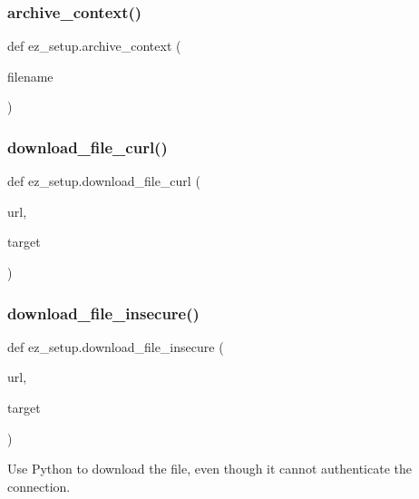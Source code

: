 \subsubsection{\texorpdfstring{archive\+\_\+context()}{archive\_context()}}
{\footnotesize\ttfamily def ez\+\_\+setup.\+archive\+\_\+context (\begin{DoxyParamCaption}\item[{}]{filename }\end{DoxyParamCaption})}

\mbox{\label{namespaceez__setup_a5c318033f0bb01ca53fd588c46f7b7ca}} 
\subsubsection{\texorpdfstring{download\+\_\+file\+\_\+curl()}{download\_file\_curl()}}
{\footnotesize\ttfamily def ez\+\_\+setup.\+download\+\_\+file\+\_\+curl (\begin{DoxyParamCaption}\item[{}]{url,  }\item[{}]{target }\end{DoxyParamCaption})}

\mbox{\label{namespaceez__setup_a77f73fd049bccd9c8b10f5be6ef16ed1}} 
\subsubsection{\texorpdfstring{download\+\_\+file\+\_\+insecure()}{download\_file\_insecure()}}
{\footnotesize\ttfamily def ez\+\_\+setup.\+download\+\_\+file\+\_\+insecure (\begin{DoxyParamCaption}\item[{}]{url,  }\item[{}]{target }\end{DoxyParamCaption})}

\begin{DoxyVerb}Use Python to download the file, even though it cannot authenticate the
connection.
\end{DoxyVerb}
 \mbox{\label{namespaceez__setup_a545d9bb16a7c1509aeb0af7ff5c63a70}} 
